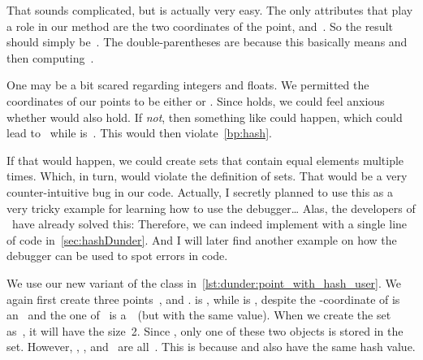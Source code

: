 %
That sounds complicated, but is actually very easy.
The only attributes that play a role in our  method are the two coordinates of the point,  and~.
So the result~ should simply be~.
The double-parentheses are because this basically means  and then computing~.%
%
\begin{sloppypar}%
One may be a bit scared regarding integers and floats.
We permitted the coordinates of our points to be either  or .
Since  holds, we could feel anxious whether  would also hold.
If \emph{not}, then something like  could happen, which could lead to~ while  is~.
This would then violate~\cref{bp:hash}.%
\end{sloppypar}%
%
If that would happen, we could create sets that contain equal elements multiple times.
Which, in turn, would violate the definition of sets.
That would be a very counter-intuitive bug in our code.
Actually, I secretly planned to use this as a very tricky example for learning how to use the debugger{\dots}
Alas, the developers of \python\ have already solved this:%
%
%
%
Therefore, we can indeed implement  with a single line of code in~\cref{sec:hashDunder}.
And I will later find another example on how the debugger can be used to spot errors in code.

We use our new variant of the  class in~\cref{lst:dunder:point_with_hash_user}.
We again first create three points~,  and .
 is , while  is , despite the \nobreakdashes-coordinate of  is an~ and the one of~ is a~~(but with the same value).
When we create the set~ as~, it will have the size~2.
Since , only one of these two objects is stored in the set.
However, , , and~ are all~.
This is because  and  also have the same hash value.

